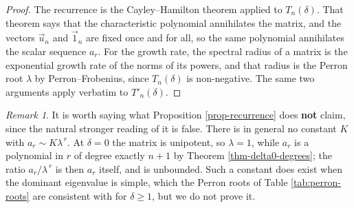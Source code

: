 \documentclass[11pt, a4paper, abstract=yes]{scrartcl}
\theoremstyle{definition}
\theoremstyle{remark}
\newtheorem{remark}[definition]{Remark}
\theoremstyle{plain}
\begin{document}
\begin{proof}
The recurrence is the Cayley--Hamilton theorem applied to \(T_n(\delta)\). That theorem says that the
characteristic polynomial annihilates the matrix, and the vectors \(\vec u_n\) and \(\vec 1_n\) are
fixed once and for all, so the same polynomial annihilates the scalar sequence \(a_r\). For the
growth rate, the spectral radius of a matrix is the exponential growth rate of the norms of its
powers, and that radius is the Perron root \(\lambda\) by Perron--Frobenius, since \(T_n(\delta)\)
is non-negative. The same two arguments apply verbatim to \(T'_n(\delta)\).
\end{proof}

\begin{remark}
It is worth saying what Proposition \ref{prop-recurrence} does \textbf{not} claim, since the natural stronger
reading of it is false. There is in general no constant \(K\) with \(a_r\sim K\lambda^{\,r}\). At
\(\delta=0\) the matrix is unipotent, so \(\lambda=1\), while \(a_r\) is a polynomial in \(r\) of
degree exactly \(n+1\) by Theorem \ref{thm-delta0-degrees}; the ratio \(a_r/\lambda^{\,r}\) is then
\(a_r\) itself, and is unbounded. Such a constant does exist when the dominant eigenvalue is
simple, which the Perron roots of Table \ref{tab:perron-roots} are consistent with for
\(\delta\ge1\), but we do not prove it.
\label{rem-recurrence-not-asymptotic}
\end{remark}
\end{document}
